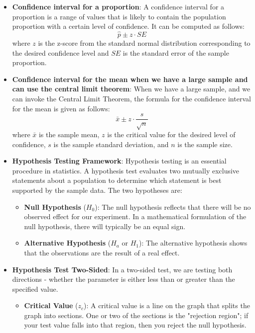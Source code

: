 \documentclass{article}
\begin{document}
\begin{itemize}
\item \textbf{Confidence interval for a proportion}: A confidence interval for a proportion is a range of values that is likely to contain the population proportion with a certain level of confidence. It can be computed as follows:
\[ \hat{p} \pm z \cdot SE \]
where $z$ is the z-score from the standard normal distribution corresponding to the desired confidence level and $SE$ is the standard error of the sample proportion.

\item \textbf{Confidence interval for the mean when we have a large sample and can use the central limit theorem}: When we have a large sample, and we can invoke the Central Limit Theorem, the formula for the confidence interval for the mean is given as follows:
\[ \bar{x} \pm z \cdot \frac{s}{\sqrt{n}} \]
where $\bar{x}$ is the sample mean, $z$ is the critical value for the desired level of confidence, $s$ is the sample standard deviation, and $n$ is the sample size.

\item \textbf{Hypothesis Testing Framework}: Hypothesis testing is an essential procedure in statistics. A hypothesis test evaluates two mutually exclusive statements about a population to determine which statement is best supported by the sample data. The two hypotheses are:

\begin{itemize}

\item \textbf{Null Hypothesis} ($H_0$): The null hypothesis reflects that there will be no observed effect for our experiment. In a mathematical formulation of the null hypothesis, there will typically be an equal sign.

\item \textbf{Alternative Hypothesis} ($H_a$ or $H_1$): The alternative hypothesis shows that the observations are the result of a real effect.

\end{itemize}

\item \textbf{Hypothesis Test Two-Sided}: In a two-sided test, we are testing both directions - whether the parameter is either less than or greater than the specified value.

\begin{itemize}

\item \textbf{Critical Value} ($z_c$): A critical value is a line on the graph that splits the graph into sections. One or two of the sections is the "rejection region"; if your test value falls into that region, then you reject the null hypothesis.


\end{itemize}
\end{itemize}
\end{document}
